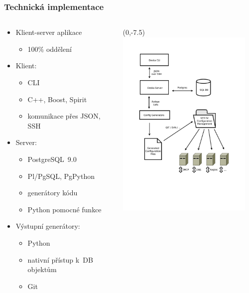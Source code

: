 \documentclass{beamer}
\begin{document}
\begin{frame}[fragile]
\frametitle{Technická implementace}
\begin{columns}
\begin{column}{.45\paperwidth}
    \begin{itemize}
        \item Klient-server aplikace
            \begin{itemize}
                \item 100\% oddělení
            \end{itemize}
        \item Klient:
            \begin{itemize}
                \item CLI
                \item C++, Boost, Spirit
                \item komunikace přes JSON, SSH
            \end{itemize}
        \item Server:
            \begin{itemize}
                \item PostgreSQL~9.0
                \item Pl/PgSQL, PgPython
                \item generátory kódu
                \item Python pomocné funkce
            \end{itemize}
        \item Výstupní generátory:
            \begin{itemize}
                \item Python
                \item nativní přístup k~DB objektům
                \item Git
            \end{itemize}
    \end{itemize}
\end{column}
\begin{column}{.55\paperwidth}
\begin{textblock}{50}(0,-7.5)
\includegraphics[width=65mm, trim=28mm 64mm 28mm 27mm, clip=true]{../../technical/img-deska-components.pdf}

\end{textblock}
\end{column}
\end{columns}
\end{frame}
\end{document}
